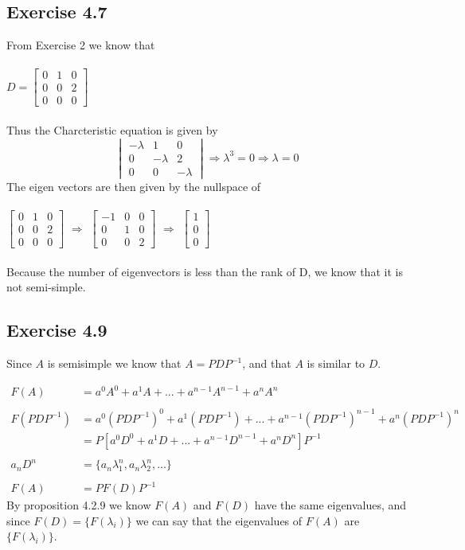 \documentclass[letterpaper,12pt]{article}
\theoremstyle{definition}
\begin{document}
\subsection*{Exercise 4.7}
From Exercise 2 we know that\\
\smallskip\\
$D = \begin{bmatrix} 
    0 & 1 & 0\\
    0 & 0 & 2\\
    0 & 0 & 0
\end{bmatrix}$\\
\smallskip\\
Thus the Charcteristic equation is given by
\[ \begin{vmatrix}
-\lambda & 1 & 0\\
0 & -\lambda & 2\\
0 & 0 & -\lambda
\end{vmatrix} \Rightarrow \lambda^3 = 0 \Rightarrow \lambda = 0\]
The eigen vectors are then given by the nullspace of \\
\smallskip\\ 
$\begin{bmatrix} 
    0 & 1 & 0\\
    0 & 0 & 2\\
    0 & 0 & 0
\end{bmatrix}$  
$\Rightarrow$ 
$\begin{bmatrix} 
    -1 & 0 & 0\\
    0 & 1 & 0\\
    0 & 0 & 2
\end{bmatrix}$
$\Rightarrow$
$\begin{bmatrix}
1\\
0\\
0
\end{bmatrix}$\\
\smallskip\\
Because the number of eigenvectors is less than the rank of D, we know that 
it is not semi-simple.

\subsection*{Exercise 4.9}
Since $A$ is semisimple we know that $A = PDP^{-1}$, and that $A$ is similar to $D$. 

\begin{align*}
F(A) &= a^{0}A^{0} + a^{1}A + ... + a^{n-1}A^{n-1} + a^{n}A^{n} \\ \\
F(PDP^{-1}) &= a^{0}(PDP^{-1})^{0} + a^{1}(PDP^{-1}) + ... + a^{n-1}(PDP^{-1})^{n-1} + a^{n}(PDP^{-1})^{n}\\
&= P[a^{0}D^{0} + a^{1}D + ... + a^{n-1}D^{n-1} + a^{n}D^{n}]P^{-1}\\ \\
a_{n}D^{n} &= \{a_{n}\lambda_{1}^{n}, a_{n}\lambda_{2}^{n}, ...\} \\ \\
F(A) &= PF(D)P^{-1}
\end{align*}
By proposition 4.2.9 we know $F(A)$ and $F(D)$ have the same eigenvalues, and since $F(D) = \{F(\lambda_{i})\}$ we can say that the eigenvalues of $F(A)$ are $\{F(\lambda_{i})\}$.
\end{document}
